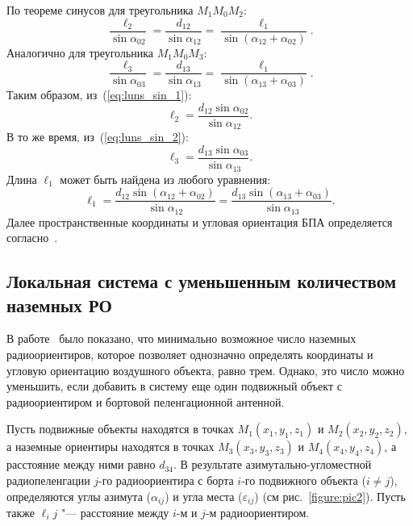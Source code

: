 \documentclass[../main.tex]{subfiles}
\begin{document}
По теореме синусов для треугольника $M_1 M_0 M_2$:
\begin{equation}\label{eq:luns_sin_1}
    \frac{\ell_2}{\sin\alpha_{02}} = \frac{d_{12}}{\sin\alpha_{12}} = \frac{\ell_1}{\sin\left(\alpha_{12} + \alpha_{02}\right)}.
\end{equation}
Аналогично для треугольника $M_1 M_0 M_3$:
\begin{equation}\label{eq:luns_sin_2}
    \frac{\ell_3}{\sin\alpha_{03}} = \frac{d_{13}}{\sin\alpha_{13}} = \frac{\ell_1}{\sin\left(\alpha_{13} + \alpha_{03}\right)}.
\end{equation}
Таким образом, из~(\ref{eq:luns_sin_1}):
\begin{equation*}
    \ell_2 = \frac{d_{12}\sin\alpha_{02}}{\sin\alpha_{12}}.
\end{equation*}
В то же время, из~(\ref{eq:luns_sin_2}):
\begin{equation*}
    \ell_3 = \frac{d_{13}\sin\alpha_{03}}{\sin\alpha_{13}}.
\end{equation*}
Длина $\ell_1$ может быть найдена из любого уравнения:
\begin{equation*}
    \ell_1 = \frac{d_{12}\sin\left(\alpha_{12} + \alpha_{02}\right)}{\sin\alpha_{12}} = \frac{d_{13}\sin\left(\alpha_{13} + \alpha_{03}\right)}{\sin\alpha_{13}}.
\end{equation*}
Далее пространственные координаты и угловая ориентация БПА определяется согласно~\cite{antennas}.

\subsection{Локальная система с уменьшенным количеством наземных РО}
В работе~\cite{antennas} было показано, что минимально возможное число наземных радиоориентиров, которое позволяет
однозначно определять координаты и угловую ориентацию воздушного объекта, равно трем. Однако, это число можно уменьшить,
если добавить в систему еще один подвижный объект с радиоориентиром и бортовой пеленгационной антенной.

Пусть подвижные объекты находятся в точках $M_1\left(x_1, y_1, z_1\right)$ и $M_2\left(x_2, y_2, z_2\right)$, а
наземные ориентиры находятся в точках $M_3\left(x_3, y_3, z_3\right)$ и $M_4\left(x_4, y_4, z_4\right)$, а расстояние
между ними равно $d_{34}$. В результате азимутально-угломестной радиопеленгации  $j$-го радиоориентира с  борта
$i$-го подвижного объекта ($i \ne j$), определяются углы азимута ($\alpha_{ij}$) и угла места ($\varepsilon_{ij}$)
(см рис.~\ref{figure:pic2}). Пусть также $\ell_ij$ "--- расстояние между $i$-м и $j$-м радиоориентиром.
\end{document}
